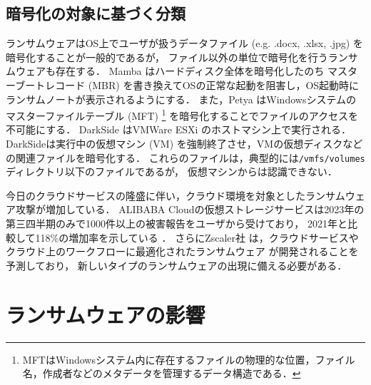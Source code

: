 \subsection{暗号化の対象に基づく分類}
ランサムウェアはOS上でユーザが扱うデータファイル (e.g. .docx, .xlsx, .jpg) を暗号化することが一般的であるが，
ファイル以外の単位で暗号化を行うランサムウェアも存在する．
Mamba \cite{mamba-petya} はハードディスク全体を暗号化したのち
マスターブートレコード (MBR) を書き換えてOSの正常な起動を阻害し，OS起動時にランサムノートが表示されるようにする．
また，Petya \cite{mamba-petya} はWindowsシステムのマスターファイルテーブル (MFT)
\footnote{MFTはWindowsシステム内に存在するファイルの物理的な位置，ファイル名，作成者などのメタデータを管理するデータ構造である．}
を暗号化することでファイルのアクセスを不可能にする．
DarkSide \cite{DarkSide42:online} はVMWare ESXi \cite{VMwarevS52:online}
のホストマシン上で実行される．DarkSideは実行中の仮想マシン (VM) を強制終了させ，VMの仮想ディスクなどの関連ファイルを暗号化する．
これらのファイルは，典型的には\texttt{/vmfs/volumes}ディレクトリ以下のファイルであるが，
仮想マシンからは認識できない．

今日のクラウドサービスの隆盛に伴い，クラウド環境を対象としたランサムウェア攻撃が増加している．
ALIBABA Cloudの仮想ストレージサービスは2023年の第三四半期のみで1000件以上の被害報告をユーザから受けており，
2021年と比較して118\%の増加率を示している \cite{wang2024ransom}．
さらにZscaler社  は，クラウドサービスやクラウド上のワークフローに最適化されたランサムウェア
が開発されることを予測\cite{zscaler-ransomware}しており，
新しいタイプのランサムウェアの出現に備える必要がある．

\section{ランサムウェアの影響}
